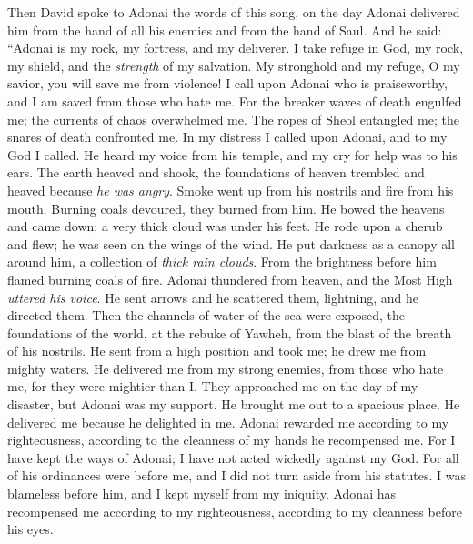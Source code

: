 \begin{biblechapter} %
 Then David spoke to Adonai the words of this song, on the day Adonai delivered him from the hand of all his enemies and from the hand of Saul.
\verse And he said: 
“Adonai is my rock, my fortress, and my deliverer.
\verse I take refuge in God, my rock, my shield, and the \textit{strength} of my salvation. 
My stronghold and my refuge, O my savior, you will save me from violence!
\verse I call upon Adonai who is praiseworthy, 
and I am saved from those who hate me.
\verse For the breaker waves of death engulfed me; 
the currents of chaos overwhelmed me.
\verse The ropes of Sheol entangled me; 
the snares of death confronted me.
\verse In my distress I called upon Adonai, and to my God I called. 
He heard my voice from his temple, 
and my cry for help was to his ears.
\verse The earth heaved and shook, 
the foundations of heaven trembled and heaved 
because \textit{he was angry}.
\verse Smoke went up from his nostrils and fire from his mouth. 
Burning coals devoured, they burned from him.
\verse He bowed the heavens and came down; 
a very thick cloud was under his feet.
\verse He rode upon a cherub and flew; 
he was seen on the wings of the wind.
\verse He put darkness as a canopy all around him, 
a collection of \textit{thick rain clouds}.
\verse From the brightness before him 
flamed burning coals of fire.
\verse Adonai thundered from heaven, 
and the Most High \textit{uttered his voice}.
\verse He sent arrows and he scattered them, 
lightning, and he directed them.
\verse Then the channels of water of the sea were exposed, 
the foundations of the world, 
at the rebuke of Yawheh, 
from the blast of the breath of his nostrils.
\verse He sent from a high position and took me; 
he drew me from mighty waters.
\verse He delivered me from my strong enemies, 
from those who hate me, for they were mightier than I.
\verse They approached me on the day of my disaster, 
but Adonai was my support.
\verse He brought me out to a spacious place. 
He delivered me because he delighted in me.
\verse Adonai rewarded me according to my righteousness, 
according to the cleanness of my hands he recompensed me.
\verse For I have kept the ways of Adonai; 
I have not acted wickedly against my God.
\verse For all of his ordinances were before me, 
and I did not turn aside from his statutes.
\verse I was blameless before him, 
and I kept myself from my iniquity.
\verse Adonai has recompensed me according to my righteousness, 
according to my cleanness before his eyes.

\end{biblechapter}
